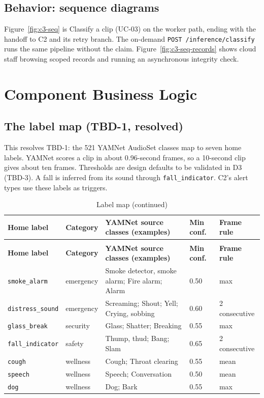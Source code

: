 \subsection{Behavior: sequence diagrams}\label{sec:c3-seq}
Figure~\ref{fig:c3-seq} is Classify a clip (UC-03) on the worker path, ending with the handoff to C2 and its
retry branch. The on-demand \texttt{POST /inference/classify} runs the same pipeline without the claim.
Figure~\ref{fig:c3-seq-records} shows cloud staff browsing scoped records and running an asynchronous integrity check.


\section{Component Business Logic}

\subsection{The label map (TBD-1, resolved)}\label{sec:c3-tbd1}
This resolves TBD-1: the 521 YAMNet AudioSet classes map to seven home labels. YAMNet scores a clip in about
0.96-second frames, so a 10-second clip gives about ten frames. Thresholds are design defaults to be validated in
D3 (TBD-3). A fall is inferred from its sound through \texttt{fall\_indicator}. C2's alert types use these labels as triggers.

\begin{longtable}{L{2.6cm}L{1.9cm}L{5.0cm}L{1.6cm}L{2.4cm}}
\caption{Label map}\\
\toprule
\textbf{Home label} & \textbf{Category} & \textbf{YAMNet source classes (examples)} & \textbf{Min conf.} & \textbf{Frame rule} \\
\midrule
\endfirsthead
\caption[]{Label map (continued)}\\
\toprule
\textbf{Home label} & \textbf{Category} & \textbf{YAMNet source classes (examples)} & \textbf{Min conf.} & \textbf{Frame rule} \\
\midrule
\endhead
\texttt{smoke\_alarm} & emergency & Smoke detector, smoke alarm; Fire alarm; Alarm & 0.50 & max \\
\texttt{distress\_sound} & emergency & Screaming; Shout; Yell; Crying, sobbing & 0.60 & 2 consecutive \\
\texttt{glass\_break} & security & Glass; Shatter; Breaking & 0.55 & max \\
\texttt{fall\_indicator} & safety & Thump, thud; Bang; Slam & 0.65 & 2 consecutive \\
\texttt{cough} & wellness & Cough; Throat clearing & 0.55 & mean \\
\texttt{speech} & wellness & Speech; Conversation & 0.50 & mean \\
\texttt{dog} & wellness & Dog; Bark & 0.55 & max \\
\bottomrule
\end{longtable}

